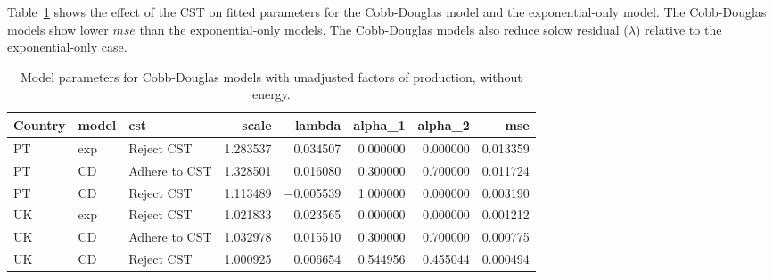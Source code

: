 \documentclass[preprint,authoryear,12pt]{elsarticle}\usepackage[]{graphicx}\usepackage[]{color}
\begin{document}
Table~\ref{tab:Effect_of_CST_CD} shows the effect of the CST 
on fitted parameters for the Cobb-Douglas model and the exponential-only model.
The Cobb-Douglas models show lower $mse$ than the exponential-only models.
The Cobb-Douglas models also reduce solow residual ($\lambda$) relative
to the exponential-only case.
%
\begin{table}[ht]
\centering
\caption{Model parameters for Cobb-Douglas models with unadjusted factors of production, without energy.} 
\label{tab:Effect_of_CST_CD}
{\tiny
\begin{tabular}{lllrrrrr}
  \hline
Country & model & cst & scale & lambda & alpha\_1 & alpha\_2 & mse \\ 
  \hline
PT & exp & Reject CST & 1.283537 & 0.034507 & 0.000000 & 0.000000 & 0.013359 \\ 
  PT & CD & Adhere to CST & 1.328501 & 0.016080 & 0.300000 & 0.700000 & 0.011724 \\ 
  PT & CD & Reject CST & 1.113489 & $-$0.005539 & 1.000000 & 0.000000 & 0.003190 \\ 
  UK & exp & Reject CST & 1.021833 & 0.023565 & 0.000000 & 0.000000 & 0.001212 \\ 
  UK & CD & Adhere to CST & 1.032978 & 0.015510 & 0.300000 & 0.700000 & 0.000775 \\ 
  UK & CD & Reject CST & 1.000925 & 0.006654 & 0.544956 & 0.455044 & 0.000494 \\ 
   \hline
\end{tabular}
}
\end{table}

%
\end{document}
